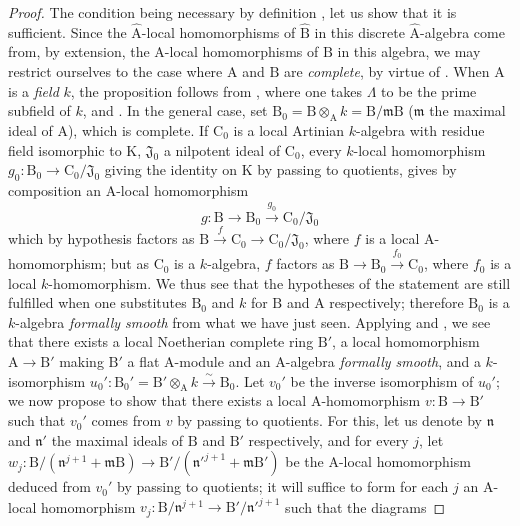 \begin{proof}
The condition being necessary by definition , let us show that it is sufficient.
Since the $\widehat{\mathrm{A}}$-local homomorphisms of $\widehat{\mathrm{B}}$ in this discrete $\widehat{\mathrm{A}}$-algebra come from, by extension, the $\mathrm{A}$-local homomorphisms of $\mathrm{B}$ in this algebra, we may restrict ourselves to the case where $\mathrm{A}$ and $\mathrm{B}$ are \emph{complete}, by virtue of .
When $\mathrm{A}$ is a \emph{field} $k$, the proposition follows from , where one takes $\Lambda$ to be the prime subfield of $k$, and .
In the general case, set $\mathrm{B}_0=\mathrm{B}\otimes_\mathrm{A}k=\mathrm{B}/\mathfrak{m}\mathrm{B}$ ($\mathfrak{m}$ the maximal ideal of $\mathrm{A}$), which is complete.
If $\mathrm{C}_0$ is a local Artinian $k$-algebra with residue field isomorphic to $\mathrm{K}$, $\mathfrak{J}_0$ a nilpotent ideal of $\mathrm{C}_0$, every $k$-local homomorphism $g_0:\mathrm{B}_0\to\mathrm{C}_0/\mathfrak{J}_0$ giving the identity on $\mathrm{K}$ by passing to quotients, gives by composition an $\mathrm{A}$-local homomorphism
\[
  g:\mathrm{B}\to\mathrm{B}_0\xrightarrow{g_0}\mathrm{C}_0/\mathfrak{J}_0
\]
which by hypothesis factors as $\mathrm{B}\xrightarrow{f}\mathrm{C}_0\to\mathrm{C}_0/\mathfrak{J}_0$, where $f$ is a local $\mathrm{A}$-homomorphism; but as $\mathrm{C}_0$ is a $k$-algebra, $f$ factors as $\mathrm{B}\to\mathrm{B}_0\xrightarrow{f_0}\mathrm{C}_0$, where $f_0$ is a local $k$-homomorphism.
We thus see that the hypotheses of the statement are still fulfilled when one substitutes $\mathrm{B}_0$ and $k$ for $\mathrm{B}$ and $\mathrm{A}$ respectively; therefore $\mathrm{B}_0$ is a $k$-algebra \emph{formally smooth} from what we have just seen.
Applying  and , we see that there exists a local Noetherian complete ring $\mathrm{B}'$, a local homomorphism $\mathrm{A}\to\mathrm{B}'$ making $\mathrm{B}'$ a flat $\mathrm{A}$-module and an $\mathrm{A}$-algebra \emph{formally smooth}, and a $k$-isomorphism $u_0':\mathrm{B}_0'=\mathrm{B}'\otimes_\mathrm{A}k\xrightarrow{\sim}\mathrm{B}_0$.
Let $v_0'$ be the inverse isomorphism of $u_0'$; we now propose to show that there exists a local $\mathrm{A}$-homomorphism $v:\mathrm{B}\to\mathrm{B}'$ such that $v_0'$ comes from $v$ by passing to quotients.
For this, let us denote by $\mathfrak{n}$ and $\mathfrak{n}'$ the maximal ideals of $\mathrm{B}$ and $\mathrm{B}'$ respectively, and for every $j$, let $w_j:\mathrm{B}/(\mathfrak{n}^{j+1}+\mathfrak{m}\mathrm{B})\to\mathrm{B}'/(\mathfrak{n}'^{j+1}+\mathfrak{m}\mathrm{B}')$ be the $\mathrm{A}$-local homomorphism deduced from $v_0'$ by passing to quotients; it will suffice to form for each $j$ an $\mathrm{A}$-local homomorphism $v_j:\mathrm{B}/\mathfrak{n}^{j+1}\to\mathrm{B}'/\mathfrak{n}'^{j+1}$ such that the diagrams

\end{proof}
